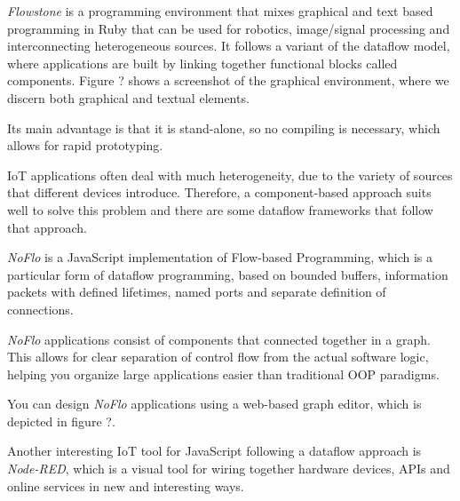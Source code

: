 \documentclass{dithesis}
\begin{document}


\textit{Flowstone}  is a programming environment that mixes graphical and text based programming in Ruby that can be used for robotics, image/signal processing and interconnecting heterogeneous sources. It follows a variant of the dataflow model, where applications are built by linking together functional blocks called components. Figure ? shows a screenshot of the graphical environment, where we discern both graphical and textual elements.


Its main advantage is that it is stand-alone, so no compiling is necessary, which allows for rapid prototyping.




IoT applications often deal with much heterogeneity, due to the variety of sources that different devices introduce. Therefore, a component-based approach suits well to solve this problem and there are some dataflow frameworks that follow that approach.


\textit{NoFlo} is a JavaScript implementation of Flow-based Programming\cite{fbp}, which is a particular form of dataflow programming, based on bounded buffers, information packets with defined lifetimes, named ports and separate definition of connections.

\textit{NoFlo} applications consist of components that connected together in a graph. This allows for clear separation of control flow from the actual software logic, helping you organize large applications easier than traditional OOP paradigms. 

You can design \textit{NoFlo} applications using a web-based graph editor, which is depicted in figure ?.



Another interesting IoT tool for JavaScript following a dataflow approach is \textit{Node-RED}\cite{node-red}, which is a visual tool for wiring together hardware devices, APIs and online services in new and interesting ways. 
\end{document}
